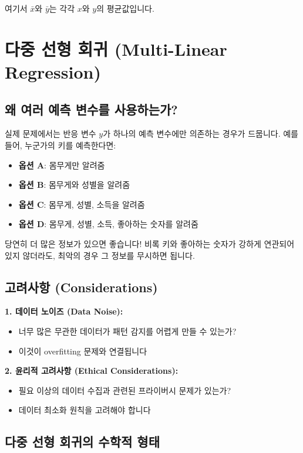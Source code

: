 \documentclass[12pt]{article}
\begin{document}
여기서 $\bar{x}$와 $\bar{y}$는 각각 $x$와 $y$의 평균값입니다.

\section{다중 선형 회귀 (Multi-Linear Regression)}

\subsection{왜 여러 예측 변수를 사용하는가?}

실제 문제에서는 반응 변수 $y$가 하나의 예측 변수에만 의존하는 경우가 드뭅니다. 예를 들어, 누군가의 키를 예측한다면:

\begin{itemize}
    \item \textbf{옵션 A}: 몸무게만 알려줌
    \item \textbf{옵션 B}: 몸무게와 성별을 알려줌
    \item \textbf{옵션 C}: 몸무게, 성별, 소득을 알려줌
    \item \textbf{옵션 D}: 몸무게, 성별, 소득, 좋아하는 숫자를 알려줌
\end{itemize}

당연히 더 많은 정보가 있으면 좋습니다! 비록 키와 좋아하는 숫자가 강하게 연관되어 있지 않더라도, 최악의 경우 그 정보를 무시하면 됩니다.

\subsection{고려사항 (Considerations)}

\textbf{1. 데이터 노이즈 (Data Noise):}
\begin{itemize}
    \item 너무 많은 무관한 데이터가 패턴 감지를 어렵게 만들 수 있는가?
    \item 이것이 overfitting 문제와 연결됩니다
\end{itemize}

\textbf{2. 윤리적 고려사항 (Ethical Considerations):}
\begin{itemize}
    \item 필요 이상의 데이터 수집과 관련된 프라이버시 문제가 있는가?
    \item 데이터 최소화 원칙을 고려해야 합니다
\end{itemize}

\subsection{다중 선형 회귀의 수학적 형태}
\end{document}
